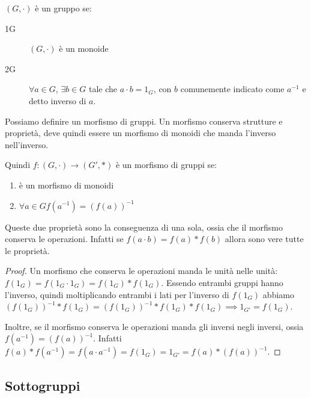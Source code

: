 \begin{defn}
$(G, \cdot)$ \`e un gruppo se:
\begin{description}
    \item[1G] $(G, \cdot)$ \`e un monoide
    \item[2G] $\forall a \in G $, $ \exists b \in G $ tale che $a \cdot b = 1_G$, con $b$ comunemente indicato come $a^{-1}$ e detto inverso di $a$.
\end{description}
\end{defn}

Possiamo definire un morfismo di gruppi. Un morfismo conserva strutture e propriet\`a, deve quindi essere un morfismo di monoidi che manda l'inverso nell'inverso.
\begin{defn}
Quindi $f : (G, \cdot) \to (G', \ast)$ \`e un morfismo di gruppi se:
\begin{enumerate}
    \item \`e un morfismo di monoidi
    \item $\forall a \in G f(a^{-1}) = (f(a))^{-1}$
\end{enumerate}
\end{defn}
\begin{prop}
Queste due propriet\`a sono la conseguenza di una sola, ossia che il morfismo conserva le operazioni. Infatti se $f(a \cdot b) = f(a) \ast f(b)$ allora sono vere tutte le propriet\`a.
\end{prop}
\begin{proof}
Un morfismo che conserva le operazioni manda le unit\`a nelle unit\`a: $f(1_G) = f(1_G \cdot 1_G) = f(1_G) \ast f(1_G)$. Essendo entrambi gruppi hanno l'inverso, quindi moltiplicando entrambi i lati per l'inverso di $f(1_G)$ abbiamo $(f(1_G))^{-1} \ast f(1_G) = (f(1_G))^{-1} \ast f(1_G) \ast f(1_G) \implies 1_{G'} = f(1_G)$.

Inoltre, se il morfismo conserva le operazioni manda gli inversi negli inversi, ossia $f(a^{-1}) = (f(a))^{-1}$. Infatti $f(a) \ast f(a^{-1}) = f(a \cdot a^{-1}) = f(1_G) = 1_{G'} = f(a) \ast (f(a))^{-1}$.
\end{proof}

\subsection{Sottogruppi}

